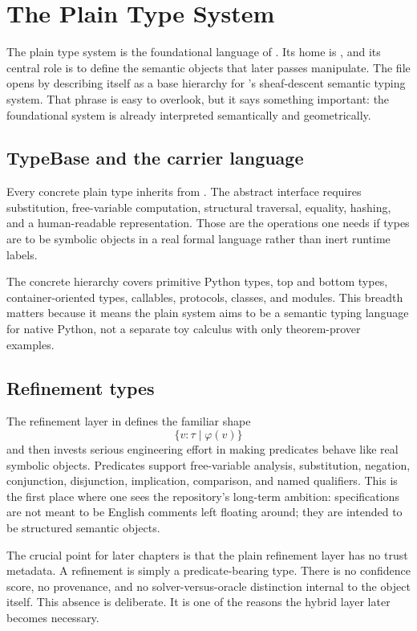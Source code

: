 \chapter{The Plain Type System}

The plain type system is the foundational language of \DepPy{}. Its home is
, and its central role is to define the semantic objects that later
passes manipulate. The file  opens by describing itself as a
base hierarchy for \DepPy{}'s sheaf-descent semantic typing system. That phrase is easy to
overlook, but it says something important: the foundational system is already interpreted
semantically and geometrically.

\section*{TypeBase and the carrier language}
Every concrete plain type inherits from . The abstract interface requires
substitution, free-variable computation, structural traversal, equality, hashing, and a
human-readable representation. Those are the operations one needs if types are to be
symbolic objects in a real formal language rather than inert runtime labels.

The concrete hierarchy covers primitive Python types, top and bottom types,
container-oriented types, callables, protocols, classes, and modules. This breadth matters
because it means the plain system aims to be a semantic typing language for native Python,
not a separate toy calculus with only theorem-prover examples.

\section*{Refinement types}
The refinement layer in  defines the familiar shape
\[
  \{v : \tau \mid \varphi(v)\}
\]
and then invests serious engineering effort in making predicates behave like real symbolic
objects. Predicates support free-variable analysis, substitution, negation, conjunction,
disjunction, implication, comparison, and named qualifiers. This is the first place where
one sees the repository's long-term ambition: specifications are not meant to be English
comments left floating around; they are intended to be structured semantic objects.

The crucial point for later chapters is that the plain refinement layer has no trust
metadata. A refinement is simply a predicate-bearing type. There is no confidence score,
no provenance, and no solver-versus-oracle distinction internal to the object itself. This
absence is deliberate. It is one of the reasons the hybrid layer later becomes necessary.

